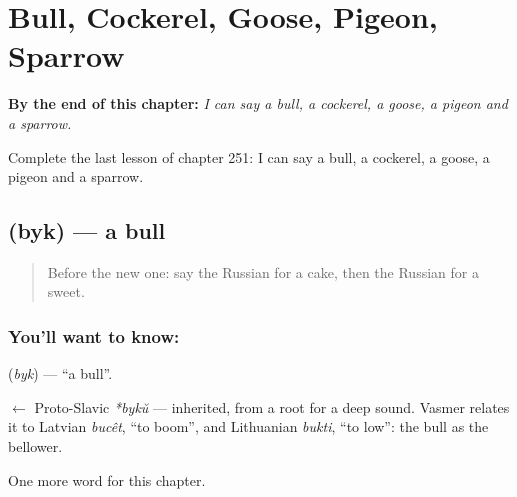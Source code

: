 
\chapter{Bull, Cockerel, Goose, Pigeon, Sparrow}
\label{ch:ru-bull-cockerel-goose-pigeon-sparrow}

\begin{chapteropening}
\textbf{By the end of this chapter:} \emph{I can say a bull, a cockerel, a goose, a pigeon and a sparrow.}

Complete the last lesson of chapter 251: I can say a bull, a cockerel, a goose, a pigeon and a sparrow.
\end{chapteropening}

\section[\texorpdfstring{\ru{бык} (byk)}{бык (byk)}]{ (byk) — a bull}

\label{lesson:RU-C251-byk}



\begin{quote}
Before the new one: say the Russian for a cake, then the Russian for a sweet.
\end{quote}

\subsection*{You'll want to know: }
\textbf{} (\emph{byk}) — \textquotedblleft{}a bull\textquotedblright{}.

\begin{cousinweb}
\textbf{} $\leftarrow$ Proto-Slavic \emph{*bykŭ} — inherited, from a root for a deep sound. Vasmer relates it to Latvian \emph{bucêt}, \textquotedblleft{}to boom\textquotedblright{}, and Lithuanian \emph{bukti}, \textquotedblleft{}to low\textquotedblright{}: the bull as the bellower.
\end{cousinweb}

\begin{grammarlens}[title={What you've built}]
One more word for this chapter.
\end{grammarlens}

